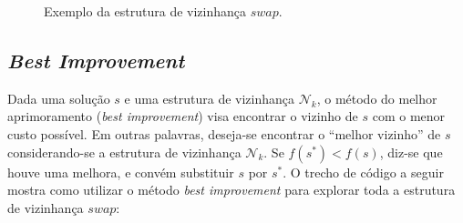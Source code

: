 \begin{figure}
{}
    \caption{Exemplo da estrutura de vizinhança \(swap\).}
    \label{fig:exemploEstruturaVizinhanca}
\end{figure}


\subsection{\textit{Best Improvement}}
Dada uma solução \(s\) e uma estrutura de vizinhança \(\mathcal{N}_k\), o método do melhor aprimoramento (\textit{best improvement}) visa encontrar o vizinho de $s$ com o menor custo possível. Em outras palavras, deseja-se encontrar o ``melhor vizinho'' de \(s\) considerando-se a estrutura de vizinhança \(\mathcal{N}_k\). Se \(f(s^*) < f(s)\), diz-se que houve uma melhora, e convém substituir \(s\) por \(s^*\). O trecho de código a seguir mostra como utilizar o método \textit{best improvement} para explorar toda a estrutura de vizinhança \(swap\):

